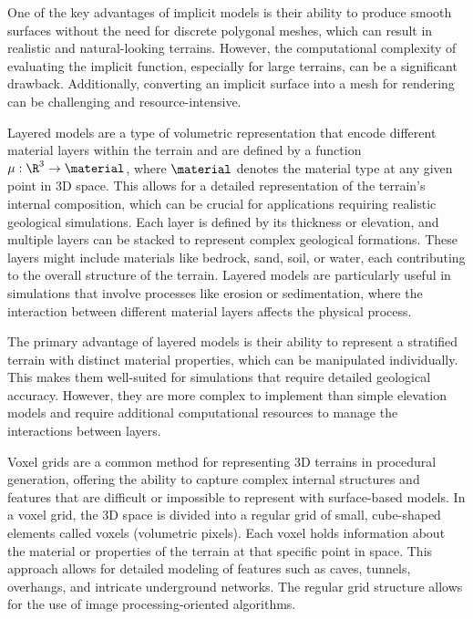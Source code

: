 One of the key advantages of implicit models is their ability to produce smooth surfaces without the need for discrete polygonal meshes, which can result in realistic and natural-looking terrains. However, the computational complexity of evaluating the implicit function, especially for large terrains, can be a significant drawback. Additionally, converting an implicit surface into a mesh for rendering can be challenging and resource-intensive. \cite{Araujo2015} 

Layered models are a type of volumetric representation that encode different material layers within the terrain and are defined by a function $\mu : \R^3 \to \material$, where $\material$ denotes the material type at any given point in 3D space. This allows for a detailed representation of the terrain's internal composition, which can be crucial for applications requiring realistic geological simulations. Each layer is defined by its thickness or elevation, and multiple layers can be stacked to represent complex geological formations. These layers might include materials like bedrock, sand, soil, or water, each contributing to the overall structure of the terrain. Layered models are particularly useful in simulations that involve processes like erosion or sedimentation, where the interaction between different material layers affects the physical process.

The primary advantage of layered models is their ability to represent a stratified terrain with distinct material properties, which can be manipulated individually. This makes them well-suited for simulations that require detailed geological accuracy. However, they are more complex to implement than simple elevation models and require additional computational resources to manage the interactions between layers. 


Voxel grids are a common method for representing 3D terrains in procedural generation, offering the ability to capture complex internal structures and features that are difficult or impossible to represent with surface-based models. In a voxel grid, the 3D space is divided into a regular grid of small, cube-shaped elements called voxels (volumetric pixels). Each voxel holds information about the material or properties of the terrain at that specific point in space. This approach allows for detailed modeling of features such as caves, tunnels, overhangs, and intricate underground networks. The regular grid structure allows for the use of image processing-oriented algorithms.


